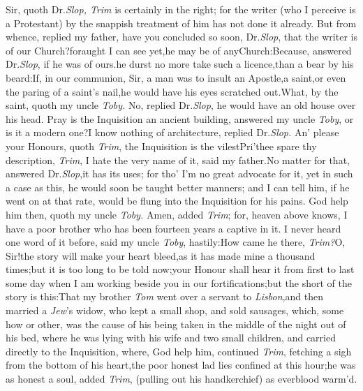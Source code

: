 \documentclass{article}
\begin{document}
Sir, quoth Dr.\@ \textit{Slop, Trim} is certainly in the right; for
the writer (who I perceive is a Protestant) by the snappish
treatment of him has not done it already. But
from whence, replied my father,\break
have you concluded so soon, Dr.\@ \textit{Slop},\break
that the writer is of our Church?\tsk for\break aught I
can see yet,\tsk he may be of any\break Church:\tsh Because,
answered Dr.\@ \textit{Slop}, if he was of ours.\tsk he durst no more
take such a licence,\tsk than a bear by his beard:\tsk If, in
our communion, Sir, a man was to insult an Apostle,\tsh a
saint,\tsh or even the paring of a saint’s
nail,\tsk he would have his eyes scratched out.\tsk What, by
the saint, quoth my
uncle \textit{Toby.} No, replied Dr.\@ \textit{Slop},\tsk
he would have an old house over his head. Pray is the Inquisition
an ancient building, answered my uncle \textit{Toby}, or is it a
modern one?\tsk I know nothing of architecture, replied
Dr.\@ \textit{Slop.}\tsh
An’ please your Honours, quoth \textit{Trim}, the Inquisition is the
vilest\tsh Pri’thee spare thy description, \textit{Trim}, I
hate the very name of it, said my father.\tsk No matter for that,
answered Dr.\@ \textit{Slop},\tsk it has its uses; for tho’
I’m no great advocate for it, yet in such a case as this, he
would soon be taught better manners; and I can tell him, if he went
on at that rate, would be flung into the Inquisition for his pains.
God help him then, quoth my uncle \textit{Toby.} Amen, added
\textit{Trim}; for, heaven above knows, I have a poor brother who has
been fourteen years a captive in it.\tsh\break
I never heard one word of it before, said
my uncle \textit{Toby}, hastily:\tsk How came he
there, \textit{Trim?}\tsh O, Sir!\@ the story will make your
heart bleed,\tsk as it has made mine a thousand times;\tsk but
it is too long to be told now;\tsh your Honour shall hear it from
first to last some day when I am working beside you in our
fortifications;\tsk but the short of the story is
this:\tsk That my brother \textit{Tom} went over a servant to
\textit{Lisbon},\tsk and then married a \textit{Jew}’s widow, who kept
a small shop, and sold sausages, which, some how or other, was the cause of
his being taken in the middle of the night out of his bed, where he
was lying with his wife and two small children, and carried
directly to the Inquisition, where, God help him, continued
\textit{Trim}, fetching a sigh from the bottom of his
heart,\tsk the poor honest lad lies confined at this
hour;\tsh\break he was
as honest a soul, added \textit{Trim}, (pulling out his handkerchief)
as ever\break blood warm’d.\tsh
\end{document}
